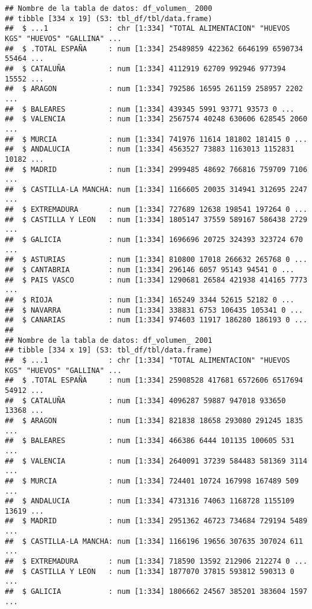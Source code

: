 \documentclass[
]{article}
\begin{document}
\begin{verbatim}
## Nombre de la tabla de datos: df_volumen_ 2000 
## tibble [334 x 19] (S3: tbl_df/tbl/data.frame)
##  $ ...1              : chr [1:334] "TOTAL ALIMENTACION" "HUEVOS KGS" "HUEVOS" "GALLINA" ...
##  $ .TOTAL ESPAÑA     : num [1:334] 25489859 422362 6646199 6590734 55464 ...
##  $ CATALUÑA          : num [1:334] 4112919 62709 992946 977394 15552 ...
##  $ ARAGON            : num [1:334] 792586 16595 261159 258957 2202 ...
##  $ BALEARES          : num [1:334] 439345 5991 93771 93573 0 ...
##  $ VALENCIA          : num [1:334] 2567574 40248 630606 628545 2060 ...
##  $ MURCIA            : num [1:334] 741976 11614 181802 181415 0 ...
##  $ ANDALUCIA         : num [1:334] 4563527 73883 1163013 1152831 10182 ...
##  $ MADRID            : num [1:334] 2999485 48692 766816 759709 7106 ...
##  $ CASTILLA-LA MANCHA: num [1:334] 1166605 20035 314941 312695 2247 ...
##  $ EXTREMADURA       : num [1:334] 727689 12638 198541 197264 0 ...
##  $ CASTILLA Y LEON   : num [1:334] 1805147 37559 589167 586438 2729 ...
##  $ GALICIA           : num [1:334] 1696696 20725 324393 323724 670 ...
##  $ ASTURIAS          : num [1:334] 810800 17018 266632 265768 0 ...
##  $ CANTABRIA         : num [1:334] 296146 6057 95143 94541 0 ...
##  $ PAIS VASCO        : num [1:334] 1290681 26584 421938 414165 7773 ...
##  $ RIOJA             : num [1:334] 165249 3344 52615 52182 0 ...
##  $ NAVARRA           : num [1:334] 338831 6753 106435 105341 0 ...
##  $ CANARIAS          : num [1:334] 974603 11917 186280 186193 0 ...
##  
## Nombre de la tabla de datos: df_volumen_ 2001 
## tibble [334 x 19] (S3: tbl_df/tbl/data.frame)
##  $ ...1              : chr [1:334] "TOTAL ALIMENTACION" "HUEVOS KGS" "HUEVOS" "GALLINA" ...
##  $ .TOTAL ESPAÑA     : num [1:334] 25908528 417681 6572606 6517694 54912 ...
##  $ CATALUÑA          : num [1:334] 4096287 59887 947018 933650 13368 ...
##  $ ARAGON            : num [1:334] 821838 18658 293080 291245 1835 ...
##  $ BALEARES          : num [1:334] 466386 6444 101135 100605 531 ...
##  $ VALENCIA          : num [1:334] 2640091 37239 584483 581369 3114 ...
##  $ MURCIA            : num [1:334] 724401 10724 167998 167489 509 ...
##  $ ANDALUCIA         : num [1:334] 4731316 74063 1168728 1155109 13619 ...
##  $ MADRID            : num [1:334] 2951362 46723 734684 729194 5489 ...
##  $ CASTILLA-LA MANCHA: num [1:334] 1166196 19656 307635 307024 611 ...
##  $ EXTREMADURA       : num [1:334] 718590 13592 212906 212274 0 ...
##  $ CASTILLA Y LEON   : num [1:334] 1877070 37815 593812 590313 0 ...
##  $ GALICIA           : num [1:334] 1806662 24567 385201 383604 1597 ...

\end{verbatim}
\end{document}
